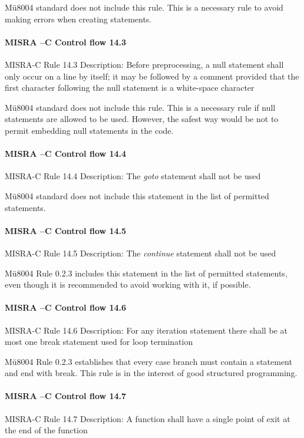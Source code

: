 Mü8004 standard does not include this rule. This is a necessary rule to avoid making errors when creating statements.

\paragraph{MISRA –C Control flow 14.3}
MISRA-C Rule 14.3 Description: Before preprocessing, a null statement shall only occur on a line by itself; it may be followed by a comment provided that the first character following the null statement is a white-space character

Mü8004 standard does not include this rule. This is a necessary rule if null statements are allowed to be used. However, the safest way would be not to permit embedding null statements in the code. 

\paragraph{MISRA –C Control flow 14.4}
MISRA-C Rule 14.4 Description: The \textit{goto} statement shall not be used

Mü8004 standard does not include this statement in the list of permitted statements.

\paragraph{MISRA –C Control flow 14.5}
MISRA-C Rule 14.5 Description: The \textit{continue} statement shall not be used

Mü8004 Rule 0.2.3 includes this statement in the list of permitted statements, even though it is recommended to avoid working with it, if possible.

\paragraph{MISRA –C Control flow 14.6}
MISRA-C Rule 14.6 Description: For any iteration statement there shall be at most one break statement used for loop termination

Mü8004 Rule 0.2.3 establishes that every case branch must contain a statement and end with break. This rule is in the interest of good structured programming.

\paragraph{MISRA –C Control flow 14.7}
MISRA-C Rule 14.7 Description: A function shall have a single point of exit at the end of the function

